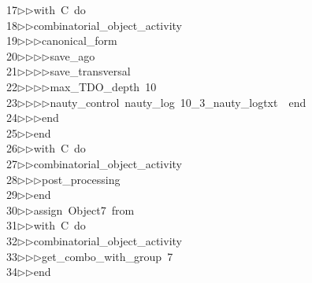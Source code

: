 \begin{tabbing}
17\>$\triangleright$\>$\triangleright$\>with\ C\ do\ \\[0pt]
18\>$\triangleright$\>$\triangleright$\>combinatorial\_object\_activity\ \\[0pt]
19\>$\triangleright$\>$\triangleright$\>$\triangleright$\>canonical\_form\ \\[0pt]
20\>$\triangleright$\>$\triangleright$\>$\triangleright$\>$\triangleright$\>save\_ago\ \\[0pt]
21\>$\triangleright$\>$\triangleright$\>$\triangleright$\>$\triangleright$\>save\_transversal\ \\[0pt]
22\>$\triangleright$\>$\triangleright$\>$\triangleright$\>$\triangleright$\>max\_TDO\_depth\ 10\ \\[0pt]
23\>$\triangleright$\>$\triangleright$\>$\triangleright$\>$\triangleright$\>nauty\_control\ nauty\_log\ 10\_3\_nauty\_logtxt\ \ end\ \\[0pt]
24\>$\triangleright$\>$\triangleright$\>$\triangleright$\>end\ \\[0pt]
25\>$\triangleright$\>$\triangleright$\>end\ \\[0pt]
26\>$\triangleright$\>$\triangleright$\>with\ C\ do\ \\[0pt]
27\>$\triangleright$\>$\triangleright$\>combinatorial\_object\_activity\ \\[0pt]
28\>$\triangleright$\>$\triangleright$\>$\triangleright$\>post\_processing\ \\[0pt]
29\>$\triangleright$\>$\triangleright$\>end\ \\[0pt]
30\>$\triangleright$\>$\triangleright$\>assign\ Object7\ from\ \\[0pt]
31\>$\triangleright$\>$\triangleright$\>with\ C\ do\ \\[0pt]
32\>$\triangleright$\>$\triangleright$\>combinatorial\_object\_activity\ \\[0pt]
33\>$\triangleright$\>$\triangleright$\>$\triangleright$\>get\_combo\_with\_group\ 7\ \\[0pt]
34\>$\triangleright$\>$\triangleright$\>end\ \\[0pt]

\end{tabbing}
